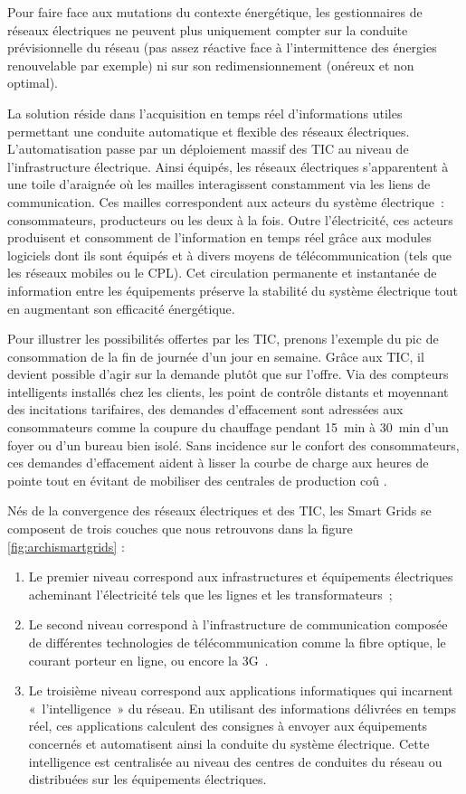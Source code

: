 Pour faire face aux mutations du contexte énergétique, les gestionnaires de 
réseaux électriques ne peuvent plus uniquement compter sur la conduite 
prévisionnelle du réseau (pas assez réactive face à l'intermittence des énergies 
renouvelable par exemple) ni sur son redimensionnement (onéreux et non optimal). 

La solution réside dans l'acquisition en temps réel d'informations utiles 
permettant une conduite automatique et flexible des réseaux électriques. 
L'automatisation passe par un déploiement massif des TIC au niveau de 
l'infrastructure électrique. Ainsi équipés, les réseaux électriques 
s'apparentent à une toile d'araignée où les mailles interagissent 
constamment via les liens de communication. Ces mailles correspondent aux 
acteurs du système 
électrique~: consommateurs, producteurs ou les deux à la fois. 
Outre l'électricité, ces acteurs produisent et consomment de l'information en 
temps réel grâce aux modules logiciels dont ils sont équipés et à divers moyens 
de 
télécommunication (tels que les réseaux mobiles ou le CPL). Cet circulation 
permanente et instantanée de information entre les équipements préserve la 
stabilité du système électrique tout en augmentant son efficacité énergétique. 

Pour illustrer les possibilités offertes par les TIC, prenons l'exemple du pic 
de consommation de la fin de journée d'un jour en semaine. Grâce aux TIC, il 
devient possible d'agir sur la demande plutôt que sur l'offre. Via des compteurs 
intelligents installés chez les clients, les point de contrôle distants et 
moyennant des incitations tarifaires, des demandes d'effacement sont adressées 
aux consommateurs comme la coupure du chauffage pendant 15~min à 30~min d'un 
foyer ou d'un bureau 
bien isolé. Sans incidence sur le confort des consommateurs, ces demandes 
d'effacement aident à lisser la courbe de charge aux heures de pointe tout en
évitant de mobiliser des centrales de production coû	. 

Nés de la convergence des réseaux électriques et des TIC, les Smart Grids se 
composent de trois couches que nous retrouvons dans la figure 
\ref{fig:archismartgrids} :
\begin{enumerate}
\item Le premier niveau correspond aux infrastructures et équipements 
électriques acheminant l'électricité tels que les lignes et les 
transformateurs~; 
\item Le second niveau correspond à l'infrastructure de communication composée 
de différentes technologies de télécommunication comme la fibre optique, le 
courant porteur en ligne, ou encore la 3G~. 
\item Le troisième niveau correspond aux applications informatiques qui 
incarnent «~l'intelligence~» du réseau.  En utilisant des informations délivrées 
en temps réel, ces applications calculent des consignes à envoyer aux 
équipements concernés et automatisent ainsi la conduite du système électrique. 
Cette intelligence est centralisée au niveau des centres de conduites du réseau 
ou distribuées sur les équipements électriques.
\end{enumerate}


